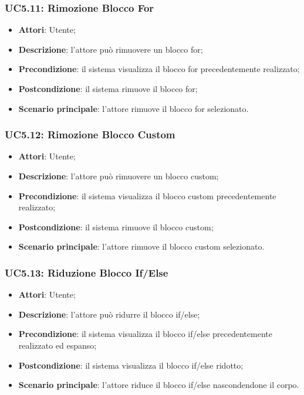 \begin{itemize}
\begin{itemize}
\begin{itemize}
\begin{itemize}
\subsubsection{UC5.11: Rimozione Blocco For}
\label{UC5.11}
\begin{itemize}
	\item \textbf{Attori}: Utente;
	\item \textbf{Descrizione}: l'attore può rimuovere un blocco for;
	\item \textbf{Precondizione}: il sistema visualizza il blocco for precedentemente realizzato;
	\item \textbf{Postcondizione}: il sistema rimuove il blocco for;
	\item \textbf{Scenario principale}: l'attore rimuove il blocco for selezionato.
\end{itemize}

\subsubsection{UC5.12: Rimozione Blocco Custom}
\label{UC5.12}
\begin{itemize}
	\item \textbf{Attori}: Utente;
	\item \textbf{Descrizione}: l'attore può rimuovere un blocco custom;
	\item \textbf{Precondizione}: il sistema visualizza il blocco custom precedentemente realizzato;
	\item \textbf{Postcondizione}: il sistema rimuove il blocco custom;
	\item \textbf{Scenario principale}: l'attore rimuove il blocco custom selezionato.
\end{itemize}

\subsubsection{UC5.13: Riduzione Blocco If/Else}
\label{UC5.13}
\begin{itemize}
	\item \textbf{Attori}: Utente;
	\item \textbf{Descrizione}: l'attore può ridurre il blocco if/else;
	\item \textbf{Precondizione}: il sistema visualizza il blocco if/else precedentemente realizzato ed espanso;
	\item \textbf{Postcondizione}: il sistema visualizza il blocco if/else ridotto;
	\item \textbf{Scenario principale}: l'attore riduce il blocco if/else nascondendone il corpo.
\end{itemize}


\end{itemize}
\end{itemize}
\end{itemize}
\end{itemize}
